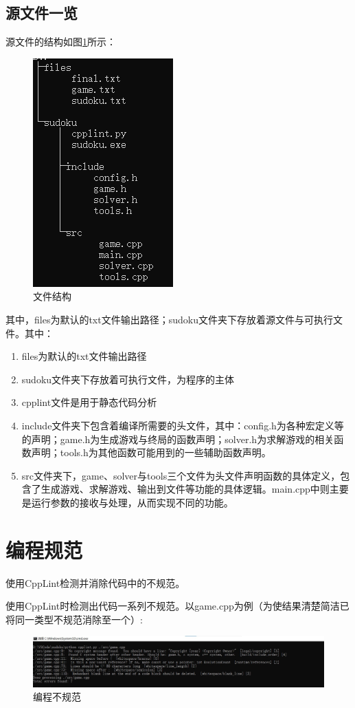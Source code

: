 \documentclass[a4paper]{article}
\begin{document}
\subsection{源文件一览}
源文件的结构如图\ref{fig:tree}所示：
\begin{figure}[!ht]
    \centering
    \includegraphics[scale=0.9]{images/tree.png}
    \caption{文件结构}
    \label{fig:tree}
\end{figure}
\par
其中，files为默认的txt文件输出路径；sudoku文件夹下存放着源文件与可执行文件。其中：
\begin{enumerate}
\item files为默认的txt文件输出路径
\item sudoku文件夹下存放着可执行文件，为程序的主体
\item cpplint文件是用于静态代码分析
\item include文件夹下包含着编译所需要的头文件，其中：config.h为各种宏定义等的声明；game.h为生成游戏与终局的函数声明；solver.h为求解游戏的相关函数声明；tools.h为其他函数可能用到的一些辅助函数声明。
\item src文件夹下，game、solver与tools三个文件为头文件声明函数的具体定义，包含了生成游戏、求解游戏、输出到文件等功能的具体逻辑。main.cpp中则主要是运行参数的接收与处理，从而实现不同的功能。

\end{enumerate}
\section{编程规范}
使用CppLint检测并消除代码中的不规范。

使用CppLint时检测出代码一系列不规范。以game.cpp为例（为使结果清楚简洁已将同一类型不规范消除至一个）:
\begin{figure}[!ht]
  \centering
  \includegraphics[scale=0.45]{images/ncpplint.jpg}
  \caption{编程不规范}
  \label{fig:ncpplint}
\end{figure}
\end{document}
